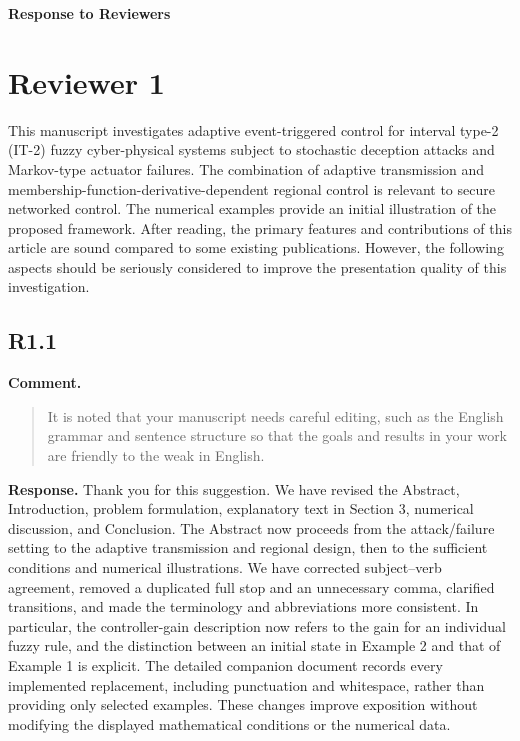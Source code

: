 \documentclass[12pt,a4paper]{article}
\begin{document}
\begin{center}
  {\Large\bfseries Response to Reviewers}
\end{center}

\section*{Reviewer 1}

This manuscript investigates adaptive event-triggered control for interval type-2 (IT-2) fuzzy cyber-physical systems subject to stochastic deception attacks and Markov-type actuator failures. The combination of adaptive transmission and membership-function-derivative-dependent regional control is relevant to secure networked control. The numerical examples provide an initial illustration of the proposed framework. After reading, the primary features and contributions of this article are sound compared to some existing publications. However, the following aspects should be seriously considered to improve the presentation quality of this investigation.

\subsection*{R1.1}

\textbf{Comment.}
\begin{quote}
\raggedright
It is noted that your manuscript needs careful editing, such as the English grammar and sentence structure so that the goals and results in your work are friendly to the weak in English.
\end{quote}

\textbf{Response.}
Thank you for this suggestion. We have revised the Abstract, Introduction, problem formulation, explanatory text in Section 3, numerical discussion, and Conclusion. The Abstract now proceeds from the attack/failure setting to the adaptive transmission and regional design, then to the sufficient conditions and numerical illustrations. We have corrected subject–verb agreement, removed a duplicated full stop and an unnecessary comma, clarified transitions, and made the terminology and abbreviations more consistent. In particular, the controller-gain description now refers to the gain for an individual fuzzy rule, and the distinction between an initial state in Example 2 and that of Example 1 is explicit. The detailed companion document records every implemented replacement, including punctuation and whitespace, rather than providing only selected examples. These changes improve exposition without modifying the displayed mathematical conditions or the numerical data.
\end{document}
